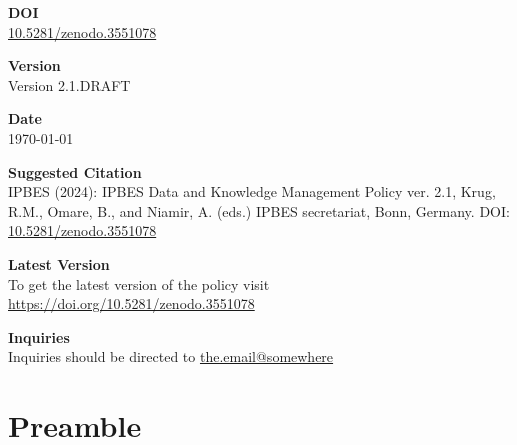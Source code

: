 \documentclass{article}
\begin{document}
\begin{center}
    \vspace{1.5em}
    
    {\LARGE \textbf{DOI}} \\[0.5em]
    \href{https://doi.org/10.5281/zenodo.3551078}{10.5281/zenodo.3551078}
    
    \vspace{1.5em}
    
    {\LARGE \textbf{Version}} \\[0.5em]
    Version 2.1.DRAFT
    
    \vspace{1.5em}
    
    {\LARGE \textbf{Date}} \\[0.5em]
    \today
    
    \vspace{1.5em}
    
    {\LARGE \textbf{Suggested Citation}} \\[0.5em]
    IPBES (2024): IPBES Data and Knowledge Management Policy ver. 2.1, Krug, R.M., Omare, B., and Niamir, A. (eds.) IPBES secretariat, Bonn, Germany. DOI: \href{https://doi.org/10.5281/zenodo.3551078}{10.5281/zenodo.3551078}
    
    \vspace{1.5em}
    
    {\LARGE \textbf{Latest Version}} \\[0.5em]
    To get the latest version of the policy visit \href{https://doi.org/10.5281/zenodo.3551078}{https://doi.org/10.5281/zenodo.3551078}
    
    \vspace{1.5em}
    
    {\LARGE \textbf{Inquiries}} \\[0.5em]
    Inquiries should be directed to \href{mailto:the.email@somewhere}{the.email@somewhere}

\end{center}

\newpage

\tableofcontents
\newpage

\section{Preamble}
\end{document}
